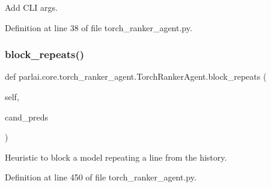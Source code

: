 \begin{DoxyVerb}Add CLI args.\end{DoxyVerb}
 

Definition at line 38 of file torch\+\_\+ranker\+\_\+agent.\+py.

\mbox{\label{classparlai_1_1core_1_1torch__ranker__agent_1_1TorchRankerAgent_a628050d71339298baafbaf678f94207d}} 
\subsubsection{\texorpdfstring{block\+\_\+repeats()}{block\_repeats()}}
{\footnotesize\ttfamily def parlai.\+core.\+torch\+\_\+ranker\+\_\+agent.\+Torch\+Ranker\+Agent.\+block\+\_\+repeats (\begin{DoxyParamCaption}\item[{}]{self,  }\item[{}]{cand\+\_\+preds }\end{DoxyParamCaption})}

\begin{DoxyVerb}Heuristic to block a model repeating a line from the history.\end{DoxyVerb}
 

Definition at line 450 of file torch\+\_\+ranker\+\_\+agent.\+py.




